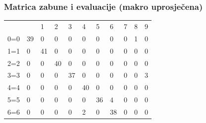 \documentclass{beamer}
\begin{document}
\begin{frame}
\frametitle{Matrica zabune i evaluacije (makro uprosječena)}

\begin{table}[h]
	\centering
	\begin{tabular}{lllllllllll}
		& \cellcolor[HTML]{FFFFFF}{\color[HTML]{333333} 0} & 1 & 2 & 3 & 4 & 5 & 6 & 7 & 8 & 9 \\ \cline{2-11}
		\multicolumn{1}{l|}{0=0} & \multicolumn{1}{l|}{\cellcolor[HTML]{FFCB2F}39} & \multicolumn{1}{l|}{0} & \multicolumn{1}{l|}{0} & \multicolumn{1}{l|}{0} & \multicolumn{1}{l|}{0} & \multicolumn{1}{l|}{0} & \multicolumn{1}{l|}{0} & \multicolumn{1}{l|}{0} & \multicolumn{1}{l|}{1} & \multicolumn{1}{l|}{0} \\ \cline{2-11}
		\multicolumn{1}{l|}{1=1} & \multicolumn{1}{l|}{0} & \multicolumn{1}{l|}{\cellcolor[HTML]{FFCB2F}41} & \multicolumn{1}{l|}{0} & \multicolumn{1}{l|}{0} & \multicolumn{1}{l|}{0} & \multicolumn{1}{l|}{0} & \multicolumn{1}{l|}{0} & \multicolumn{1}{l|}{0} & \multicolumn{1}{l|}{0} & \multicolumn{1}{l|}{0} \\ \cline{2-11}
		\multicolumn{1}{l|}{2=2} & \multicolumn{1}{l|}{0} & \multicolumn{1}{l|}{0} & \multicolumn{1}{l|}{\cellcolor[HTML]{FFCB2F}40} & \multicolumn{1}{l|}{0} & \multicolumn{1}{l|}{0} & \multicolumn{1}{l|}{0} & \multicolumn{1}{l|}{0} & \multicolumn{1}{l|}{0} & \multicolumn{1}{l|}{0} & \multicolumn{1}{l|}{0} \\ \cline{2-11}
		\multicolumn{1}{l|}{3=3} & \multicolumn{1}{l|}{0} & \multicolumn{1}{l|}{0} & \multicolumn{1}{l|}{0} & \multicolumn{1}{l|}{\cellcolor[HTML]{FFCB2F}37} & \multicolumn{1}{l|}{0} & \multicolumn{1}{l|}{0} & \multicolumn{1}{l|}{0} & \multicolumn{1}{l|}{0} & \multicolumn{1}{l|}{0} & \multicolumn{1}{l|}{3} \\ \cline{2-11}
		\multicolumn{1}{l|}{4=4} & \multicolumn{1}{l|}{0} & \multicolumn{1}{l|}{0} & \multicolumn{1}{l|}{0} & \multicolumn{1}{l|}{0} & \multicolumn{1}{l|}{\cellcolor[HTML]{FFCB2F}40} & \multicolumn{1}{l|}{0} & \multicolumn{1}{l|}{0} & \multicolumn{1}{l|}{0} & \multicolumn{1}{l|}{0} & \multicolumn{1}{l|}{0} \\ \cline{2-11}
		\multicolumn{1}{l|}{5=5} & \multicolumn{1}{l|}{0} & \multicolumn{1}{l|}{0} & \multicolumn{1}{l|}{0} & \multicolumn{1}{l|}{0} & \multicolumn{1}{l|}{0} & \multicolumn{1}{l|}{\cellcolor[HTML]{FFCB2F}36} & \multicolumn{1}{l|}{4} & \multicolumn{1}{l|}{0} & \multicolumn{1}{l|}{0} & \multicolumn{1}{l|}{0} \\ \cline{2-11}
		\multicolumn{1}{l|}{6=6} & \multicolumn{1}{l|}{0} & \multicolumn{1}{l|}{0} & \multicolumn{1}{l|}{0} & \multicolumn{1}{l|}{0} & \multicolumn{1}{l|}{2} & \multicolumn{1}{l|}{0} & \multicolumn{1}{l|}{\cellcolor[HTML]{FFCB2F}38} & \multicolumn{1}{l|}{0} & \multicolumn{1}{l|}{0} & \multicolumn{1}{l|}{0} \\ \cline{2-11}

\end{tabular}
\end{table}
\end{frame}
\end{document}
